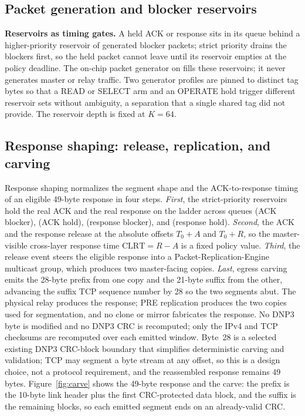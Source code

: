 \subsection{Packet generation and blocker reservoirs}
\textbf{Reservoirs as timing gates.} A held ACK or response sits in its queue behind a higher-priority
reservoir of generated blocker packets; strict priority drains the blockers first, so the held packet
cannot leave until its reservoir empties at the policy deadline. The on-chip packet generator on
 fills these reservoirs; it never generates master or relay traffic. Two generator profiles
are pinned to distinct tag bytes so that a READ or SELECT arm and an OPERATE hold trigger different
reservoir sets without ambiguity, a separation that a single shared tag did not provide. The reservoir
depth is fixed at $K{=}64$.

\subsection{Response shaping: release, replication, and carving}
Response shaping normalizes the segment shape and the ACK-to-response timing of an
eligible 49-byte response in four steps. \emph{First}, the strict-priority reservoirs hold the real
ACK and the real response on the  ladder across queues  (ACK blocker),
 (ACK hold),  (response blocker), and  (response hold).
\emph{Second}, the ACK and the response release at the absolute offsets $T_0{+}A$ and $T_0{+}R$, so the
master-visible cross-layer response time $\mathrm{CLRT}=R-A$ is a fixed policy value. \emph{Third}, the
release event steers the eligible response into a Packet-Replication-Engine multicast group, which
produces two master-facing copies. \emph{Last}, egress carving emits the 28-byte prefix from one copy
and the 21-byte suffix from the other, advancing the suffix TCP sequence number by 28 so the two
segments abut. The physical relay produces the response; PRE replication produces the two copies used
for segmentation, and no clone or mirror fabricates the response. No DNP3 byte is modified and no DNP3
CRC is recomputed; only the IPv4 and TCP checksums are recomputed over each emitted window. Byte~28 is
a selected existing DNP3 CRC-block boundary that simplifies deterministic carving and validation; TCP
may segment a byte stream at any offset, so this is a design choice, not a protocol requirement, and
the reassembled response remains 49 bytes. Figure~\ref{fig:carve} shows the 49-byte response and the
carve: the prefix is the 10-byte link header plus the first CRC-protected data block, and the suffix
is the remaining blocks, so each emitted segment ends on an already-valid CRC.

